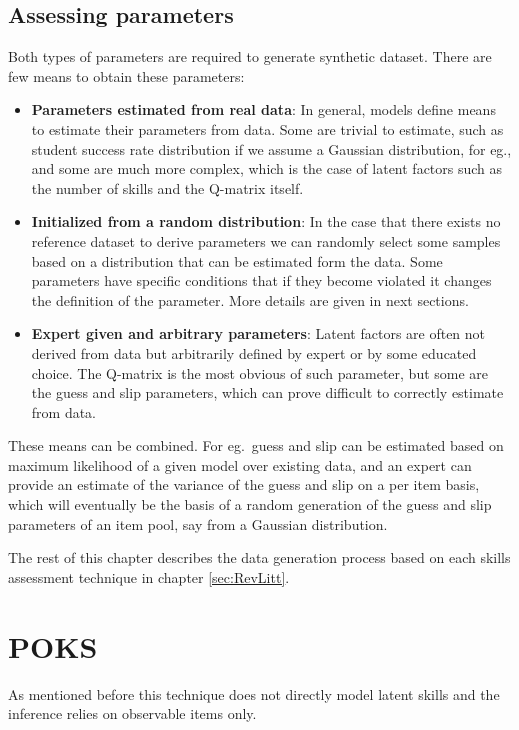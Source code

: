 \subsection{Assessing parameters}

Both types of parameters are required to generate synthetic dataset. There are few means to obtain these parameters:
\begin{itemize}
\item \textbf{Parameters estimated from real data}: In general, models define means to estimate their parameters from data. Some are trivial to estimate, such as student success rate distribution if we assume a Gaussian distribution, for eg., and some are much more complex, which is the case of latent factors such as the number of skills and the Q-matrix itself.
\item \textbf{Initialized from a random distribution}: In the case that there exists no reference dataset to derive parameters we can randomly select some samples based on a distribution that can be estimated form the data. Some parameters have specific conditions that if they become violated it changes the definition of the parameter. More details are given in next sections.
\item \textbf{Expert given and arbitrary parameters}: Latent factors are often not derived from data but arbitrarily defined by expert or by some educated choice. The Q-matrix is the most obvious of such parameter, but some are the guess and slip parameters, which can prove difficult to correctly estimate from data.

\end{itemize}

These means can be combined. For eg.\ guess and slip can be estimated based on maximum likelihood of a given model over existing data, and an expert can provide an estimate of the variance of the guess and slip on a per item basis, which will eventually be the basis of a random generation of the guess and slip parameters of an item pool, say from a Gaussian distribution.

The rest of this chapter describes the data generation process based on each skills assessment technique in chapter \ref{sec:RevLitt}.

\section{POKS}

As mentioned before this technique does not directly model latent skills and the inference relies on observable items only. 

